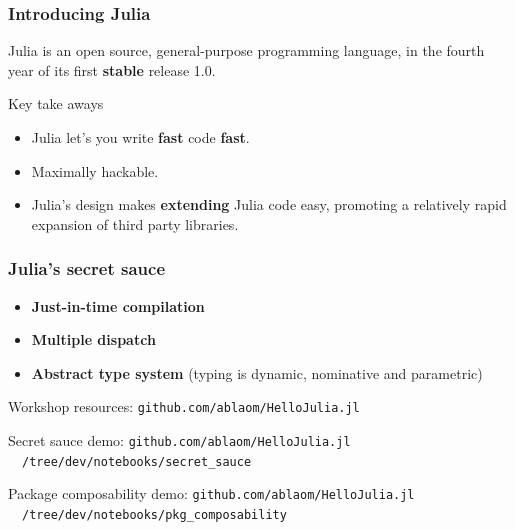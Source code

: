 \documentclass[t]{beamer}
\newcommand\df{\bf\color{Maroon}}
\begin{document}



\begin{frame}
  \frametitle{Introducing Julia}
  Julia is an open source, general-purpose programming language, in
  the fourth year of its first {\df stable} release 1.0.

  \begin{block}{Key take aways}
    \begin{itemize}
    \item Julia let's you write {\df fast}
      code {\df fast}.
    \item Maximally hackable.
    \item Julia's design makes {\df extending} Julia code easy,
      promoting a relatively rapid expansion of third party libraries.
    \end{itemize}
  \end{block}
\end{frame}

\begin{frame}
  \frametitle{Julia's secret sauce}
    \begin{itemize}
    \item {\df Just-in-time compilation}
    \item {\df Multiple dispatch}
    \item {\df Abstract type system} (typing is dynamic, nominative and parametric)
  \end{itemize}
\end{frame}

\begin{frame}
  \begin{block}{Workshop resources:}
    {\large\texttt{github.com/ablaom/HelloJulia.jl}}
    \end{block}
\end{frame}

\begin{frame}
  \begin{block}{Secret sauce demo:}
    {\large\texttt{github.com/ablaom/HelloJulia.jl}}\newline
    {\large\mbox{~~}\texttt{/tree/dev/notebooks/secret\_sauce}}
    \end{block}
\end{frame}
%
\begin{frame}
  \begin{block}{Package composability demo:}
    {\large\texttt{github.com/ablaom/HelloJulia.jl}}\newline
    {\large\mbox{~~}\texttt{/tree/dev/notebooks/pkg\_composability}}
    \end{block}
\end{frame}
\end{document}
